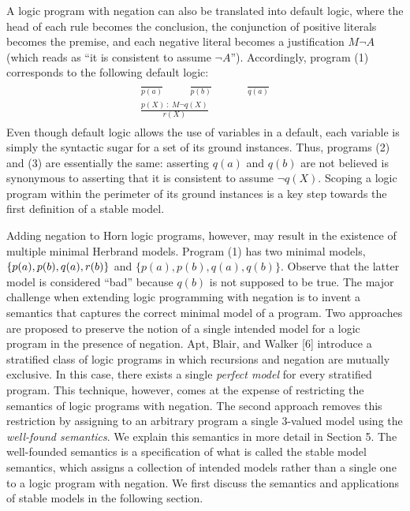 A logic program with negation can also be translated into default logic, where the head 
of each rule becomes the conclusion, the conjunction of positive literals becomes the premise, 
and each negative literal becomes a justification $M \neg A$ (which reads as ``it is consistent to assume $\neg A$''). 
Accordingly, program (1) corresponds to the following default logic:
\begin{align}
    \begin{split}
        \frac{}{p(a)} \hspace{1cm} \frac{}{p(b)} \hspace{1cm} &\frac{}{q(a)} \\ 
        \frac{p(X) \: : \: M \neg q(X)}{r(X)}&
    \end{split}
\end{align}
Even though default logic allows the use of variables in a default, each variable is simply 
the syntactic sugar for a set of its ground instances. Thus, programs (2) and (3) are essentially 
the same: asserting $q(a)$ and $q(b)$ are not believed is synonymous to asserting that it is consistent to assume 
$\neg q(X)$. Scoping a logic program within the perimeter of its ground instances is a key step 
towards the first definition of a stable model. 

Adding negation to Horn logic programs, however, may result in the existence of multiple minimal 
Herbrand models. 
Program (1) has two minimal models, $\{p(a),p(b),\\q(a),r(b)\}$ and $\{p(a),p(b),q(a),q(b)\}$. 
Observe that the latter model is considered ``bad'' because $q(b)$ is not supposed to be true. 
The major challenge when extending logic programming with negation is to invent a semantics that 
captures the correct minimal model of a program. 
Two approaches are proposed to preserve the notion of a single intended model for a logic program 
in the presence of negation. 
Apt, Blair, and Walker [6] introduce a stratified class of logic programs in which recursions and negation are 
mutually exclusive. In this case, there exists a single \emph{perfect model} for every stratified program. 
This technique, however, comes at the expense of restricting the semantics of logic programs with negation. 
The second approach removes this restriction by assigning to an arbitrary program a single 3-valued 
model using the \emph{well-found semantics}. We explain this semantics in more detail in Section 5. The 
well-founded semantics is a specification of what is called the stable model semantics, which 
assigns a collection of intended models rather than a single one to a logic program with negation. 
We first discuss the semantics and applications of stable models in the following section. 